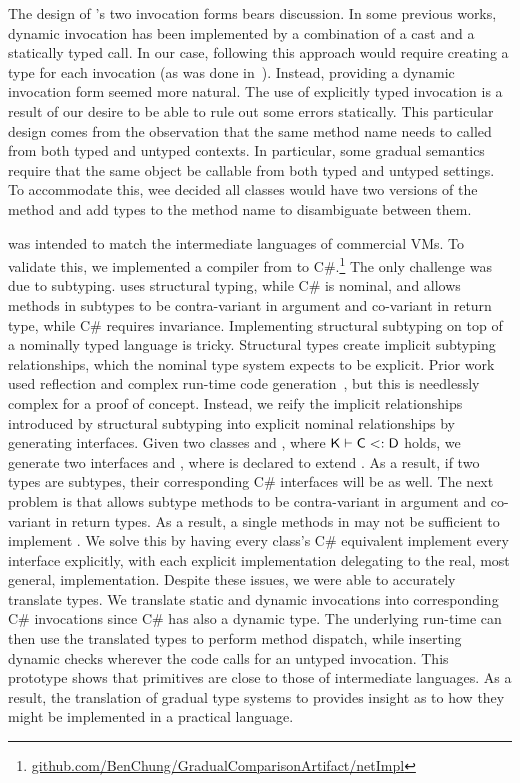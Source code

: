 \documentclass[USenglish]{tex/lipics-v2016}f
\begin{document}
The design of \kafka's two invocation forms bears discussion. In some
previous works, dynamic invocation has been implemented by a combination of
a cast and a statically typed call.  In our case, following this approach
would require creating a type for each invocation (as was done
in~\cite{popl10}). Instead, providing a dynamic invocation form seemed more natural.
The use of explicitly typed invocation is a result of our
desire to be able to rule out some errors statically. This particular design
comes from the observation that the same method name needs to called from
both typed and untyped contexts. In particular, some gradual semantics
require that the same object be callable from both typed and untyped settings.
To accommodate this, wee decided
all classes would have two versions of the method and add types to the
method name to disambiguate between them.

\kafka was intended to match the intermediate languages of commercial VMs.
To validate this, we implemented a compiler from \kafka to
C\#.\footnote{\small\url{github.com/BenChung/GradualComparisonArtifact/netImpl}}
The only challenge was due to subtyping. \kafka uses structural typing,
while C\# is nominal, and \kafka allows methods in subtypes to be
contra-variant in argument and co-variant in return type, while C\# requires
invariance.  Implementing structural subtyping on top of a nominally typed
language is tricky. Structural types create implicit subtyping
relationships, which the nominal type system expects to be explicit.  Prior
work used reflection and complex run-time code
generation~\cite{StructuralTypesOnJVM}, but this is needlessly complex for a
proof of concept.  Instead, we reify the implicit relationships introduced
by structural subtyping into explicit nominal relationships by generating
interfaces. Given two classes \C and \D, where $\K\vdash \C \Sub \D$ holds,
we generate two interfaces  and , where  is declared to
extend . As a result, if two types are subtypes, their corresponding
C\# interfaces will be as well.  The next problem is that \kafka allows
subtype methods to be contra-variant in argument and co-variant in return
types.  As a result, a single methods in  may not be sufficient to
implement .  We solve this by having every class's C\# equivalent
implement every interface explicitly, with each explicit implementation
delegating to the real, most general, implementation.  Despite these issues,
we were able to accurately translate \kafka types. We translate static and
dynamic invocations into corresponding C\# invocations since C\# has also a
dynamic type. The underlying run-time can then use the translated \kafka
types to perform method dispatch, while inserting dynamic checks wherever
the \kafka code calls for an untyped invocation. This prototype shows that
\kafka primitives are close to those of intermediate languages. As a result,
the translation of gradual type systems to \kafka provides insight as to how
they might be implemented in a practical language.
\end{document}

